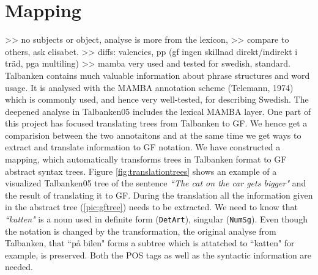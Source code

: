 \documentclass{report}
\begin{document}

\section{Mapping}
>> no subjects or object, analyse is more from the lexicon,
>> compare to others, ask elisabet.
>> diffs: valencies, pp (gf ingen skillnad direkt/indirekt i träd, pga multiling)
>> mamba very used and tested for swedish, standard.
\label{sec:Mapping}
Talbanken contains much valuable information about phrase structures and word 
usage. It is analysed with the MAMBA annotation scheme (Telemann, 1974) which is 
commonly used, and hence very well-tested, for describing Swedish.
The deepened analyse in Talbanken05 includes the lexical MAMBA layer. 
One part of this project has focused translating trees from Talbanken to GF.
We hence get a comparision between the two annotaitons and at the same time
we get ways to extract and translate information to GF notation. We have
constructed a mapping, which 
automatically transforms trees in Talbanken format to GF abstract syntax trees.
Figure \ref{fig:translationtrees} shows an example of a visualized Talbanken05 tree
of the sentence \emph{``The cat on the car gets bigger"} and the result of translating it to GF.
During the translation all the information given in the abstract tree
(\ref{pic:gftree}) needs to be extracted. We need to know that \emph{``katten"} is a noun
used in definite form (\verb-DetArt-), singular (\verb-NumSg-). Even though the
notation is changed by the transformation, the original analyse from Talbanken,
that ``på bilen" forms a subtree which is attatched to ``katten" for example,
is preserved.
Both the POS tags as well as the syntactic information are needed.
\end{document}

